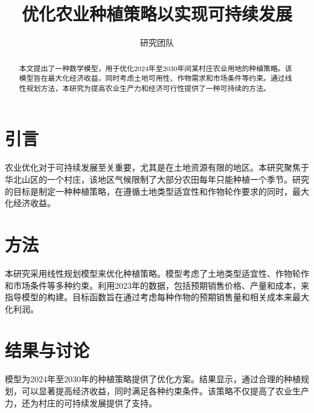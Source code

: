 \documentclass{article}
\title{优化农业种植策略以实现可持续发展}
\author{研究团队}
\begin{document}
\maketitle

\begin{abstract}
本文提出了一种数学模型，用于优化2024年至2030年间某村庄农业用地的种植策略。该模型旨在最大化经济收益，同时考虑土地可用性、作物需求和市场条件等约束。通过线性规划方法，本研究为提高农业生产力和经济可行性提供了一种可持续的方法。
\end{abstract}

\section{引言}

农业优化对于可持续发展至关重要，尤其是在土地资源有限的地区。本研究聚焦于华北山区的一个村庄，该地区气候限制了大部分农田每年只能种植一个季节。研究的目标是制定一种种植策略，在遵循土地类型适宜性和作物轮作要求的同时，最大化经济收益。

\section{方法}

本研究采用线性规划模型来优化种植策略。模型考虑了土地类型适宜性、作物轮作和市场条件等多种约束。利用2023年的数据，包括预期销售价格、产量和成本，来指导模型的构建。目标函数旨在通过考虑每种作物的预期销售量和相关成本来最大化利润。

\section{结果与讨论}

模型为2024年至2030年的种植策略提供了优化方案。结果显示，通过合理的种植规划，可以显著提高经济收益，同时满足各种约束条件。该策略不仅提高了农业生产力，还为村庄的可持续发展提供了支持。



\end{document}
